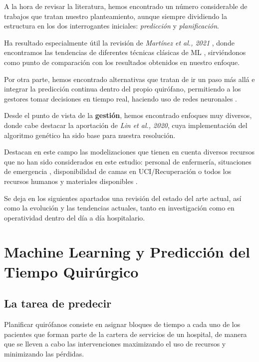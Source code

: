 

A la hora de revisar la literatura, hemos encontrado un número considerable de trabajos que tratan nuestro planteamiento, aunque siempre dividiendo la estructura en los dos interrogantes iniciales: \textit{predicción} y \textit{planificación}.

Ha resultado especialmente útil la revisión de \textit{Martínez et al., 2021} \cite{Martinez2021MachinePrediction}, donde encontramos las tendencias de diferentes técnicas clásicas de ML , sirviéndonos como punto de comparación con los resultados obtenidos en nuestro enfoque.

Por otra parte, hemos encontrado alternativas que tratan de ir un paso más allá e integrar la predicción continua dentro del propio quirófano, permitiendo a los gestores tomar decisiones en tiempo real, haciendo uso de redes neuronales \cite{Jiao2022ContinuousNetwork}.

Desde el punto de vista de la \textbf{gestión}, hemos encontrado enfoques muy diversos, donde cabe destacar la aportación de  \textit{Lin et al., 2020}\cite{Lin2020AScheduling}, cuya implementación del algoritmo genético ha sido base para nuestra resolución.

Destacan en este campo las modelizaciones que tienen en cuenta diversos recursos que no han sido considerados en este estudio: personal de enfermería\cite{DiMartinelly2014AnScheduling}, situaciones de emergencia \cite{Nouaouri2011OperatingDisaster}, disponibilidad de camas en UCI/Recuperación \cite{Celik2023APrinciple} o todos los recursos humanos y materiales disponibles \cite{Bargetto2023AConstraints}.

Se deja en los siguientes apartados una revisión del estado del arte actual, así como la evolución y las tendencias actuales, tanto en investigación como en operatividad dentro del día a día hospitalario.
\newpage

\section{Machine Learning y Predicción del Tiempo Quirúrgico}

\subsection{La tarea de predecir}

Planificar quirófanos consiste en asignar bloques de tiempo a cada uno de los pacientes que forman parte de la cartera de servicios de un hospital, de manera que se lleven a cabo las intervenciones maximizando el uso de recursos y minimizando las pérdidas.

